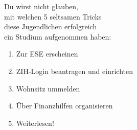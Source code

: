 
\hspace*{4em}Du wirst nicht glauben,\\
\hspace*{8em}mit welchen 5 seltsamen Tricks\\
\hspace*{12em}diese Jugendlichen erfolgreich\\
\hspace*{16em}ein Studium aufgenommen haben:\\[2em]

{
\LARGE
\hspace*{2cm}
\begin{enumerate}[label={\raisebox{.1cm}{\colorbox{gray!60}{\normalsize\textcolor{white}{\arabic*}}}}, itemsep=1cm, labelsep=.75cm, labelindent=.75cm, leftmargin=*]
  \item Zur ESE erscheinen
  \item ZIH-Login beantragen und einrichten
  \item Wohnsitz ummelden
  \item Über Finanzhilfen organisieren
  \item Weiterlesen!
\end{enumerate}
}
